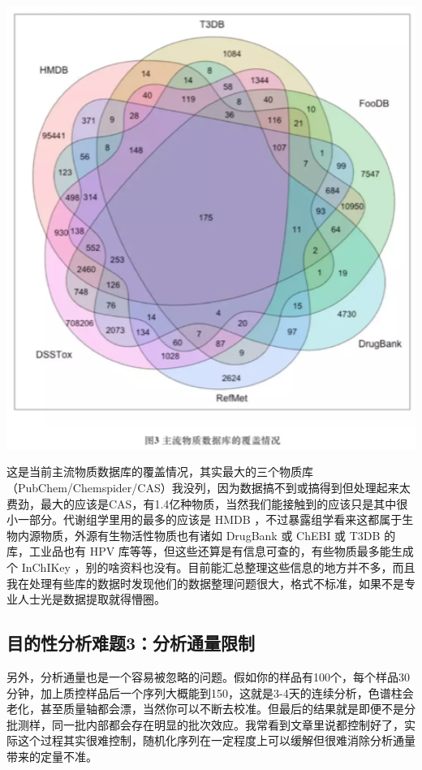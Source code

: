 \documentclass[
]{book}
\begin{document}
\includegraphics[width=6.17in]{images/expo3}

这是当前主流物质数据库的覆盖情况，其实最大的三个物质库（PubChem/Chemspider/CAS）我没列，因为数据搞不到或搞得到但处理起来太费劲，最大的应该是CAS，有1.4亿种物质，当然我们能接触到的应该只是其中很小一部分。代谢组学里用的最多的应该是 HMDB ，不过暴露组学看来这都属于生物内源物质，外源有生物活性物质也有诸如 DrugBank 或 ChEBI 或 T3DB 的库，工业品也有 HPV 库等等，但这些还算是有信息可查的，有些物质最多能生成个 InChIKey ，别的啥资料也没有。目前能汇总整理这些信息的地方并不多，而且我在处理有些库的数据时发现他们的数据整理问题很大，格式不标准，如果不是专业人士光是数据提取就得懵圈。

\hypertarget{ux76eeux7684ux6027ux5206ux6790ux96beux98983ux5206ux6790ux901aux91cfux9650ux5236}{%
\subsection{目的性分析难题3：分析通量限制}\label{ux76eeux7684ux6027ux5206ux6790ux96beux98983ux5206ux6790ux901aux91cfux9650ux5236}}

另外，分析通量也是一个容易被忽略的问题。假如你的样品有100个，每个样品30分钟，加上质控样品后一个序列大概能到150，这就是3-4天的连续分析，色谱柱会老化，甚至质量轴都会漂，当然你可以不断去校准。但最后的结果就是即便不是分批测样，同一批内部都会存在明显的批次效应。我常看到文章里说都控制好了，实际这个过程其实很难控制，随机化序列在一定程度上可以缓解但很难消除分析通量带来的定量不准。
\end{document}
